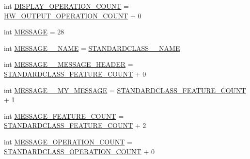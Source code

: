 \begin{DoxyCompactItemize}
\item 
int \hyperlink{interfaceshootingmachineemfmodel_1_1_shootingmachineemfmodel_package_a1b4ff159ceee549b0563fa4a343b65c2}{D\-I\-S\-P\-L\-A\-Y\-\_\-\-O\-P\-E\-R\-A\-T\-I\-O\-N\-\_\-\-C\-O\-U\-N\-T} = \hyperlink{interfaceshootingmachineemfmodel_1_1_shootingmachineemfmodel_package_a911c6904fe8043130ce479d0e1d2e0b6}{H\-W\-\_\-\-O\-U\-T\-P\-U\-T\-\_\-\-O\-P\-E\-R\-A\-T\-I\-O\-N\-\_\-\-C\-O\-U\-N\-T} + 0
\item 
int \hyperlink{interfaceshootingmachineemfmodel_1_1_shootingmachineemfmodel_package_a6cfab10c1d9f4ff2b045b82dabf2fca5}{M\-E\-S\-S\-A\-G\-E} = 28
\item 
int \hyperlink{interfaceshootingmachineemfmodel_1_1_shootingmachineemfmodel_package_a06b089367823068502816e69da5d9962}{M\-E\-S\-S\-A\-G\-E\-\_\-\-\_\-\-N\-A\-M\-E} = \hyperlink{interfaceshootingmachineemfmodel_1_1_shootingmachineemfmodel_package_a06475d7d54d52ee19b2aaf4d5d73c738}{S\-T\-A\-N\-D\-A\-R\-D\-C\-L\-A\-S\-S\-\_\-\-\_\-\-N\-A\-M\-E}
\item 
int \hyperlink{interfaceshootingmachineemfmodel_1_1_shootingmachineemfmodel_package_a128890f7aa05acf3d43a605af26d154b}{M\-E\-S\-S\-A\-G\-E\-\_\-\-\_\-\-M\-E\-S\-S\-A\-G\-E\-\_\-\-H\-E\-A\-D\-E\-R} = \hyperlink{interfaceshootingmachineemfmodel_1_1_shootingmachineemfmodel_package_a14037f66989b3107e402142df96ee9aa}{S\-T\-A\-N\-D\-A\-R\-D\-C\-L\-A\-S\-S\-\_\-\-F\-E\-A\-T\-U\-R\-E\-\_\-\-C\-O\-U\-N\-T} + 0
\item 
int \hyperlink{interfaceshootingmachineemfmodel_1_1_shootingmachineemfmodel_package_a73a9b27935f74a04999cbd904026a86f}{M\-E\-S\-S\-A\-G\-E\-\_\-\-\_\-\-M\-Y\-\_\-\-M\-E\-S\-S\-A\-G\-E} = \hyperlink{interfaceshootingmachineemfmodel_1_1_shootingmachineemfmodel_package_a14037f66989b3107e402142df96ee9aa}{S\-T\-A\-N\-D\-A\-R\-D\-C\-L\-A\-S\-S\-\_\-\-F\-E\-A\-T\-U\-R\-E\-\_\-\-C\-O\-U\-N\-T} + 1
\item 
int \hyperlink{interfaceshootingmachineemfmodel_1_1_shootingmachineemfmodel_package_aebbfc790024953cdc7c3f7d721c99cfc}{M\-E\-S\-S\-A\-G\-E\-\_\-\-F\-E\-A\-T\-U\-R\-E\-\_\-\-C\-O\-U\-N\-T} = \hyperlink{interfaceshootingmachineemfmodel_1_1_shootingmachineemfmodel_package_a14037f66989b3107e402142df96ee9aa}{S\-T\-A\-N\-D\-A\-R\-D\-C\-L\-A\-S\-S\-\_\-\-F\-E\-A\-T\-U\-R\-E\-\_\-\-C\-O\-U\-N\-T} + 2
\item 
int \hyperlink{interfaceshootingmachineemfmodel_1_1_shootingmachineemfmodel_package_a6326f815e736e221ea20b98e0ccf391b}{M\-E\-S\-S\-A\-G\-E\-\_\-\-O\-P\-E\-R\-A\-T\-I\-O\-N\-\_\-\-C\-O\-U\-N\-T} = \hyperlink{interfaceshootingmachineemfmodel_1_1_shootingmachineemfmodel_package_a2fe5d848cfe0a02fe5609e2c5ed7e7c7}{S\-T\-A\-N\-D\-A\-R\-D\-C\-L\-A\-S\-S\-\_\-\-O\-P\-E\-R\-A\-T\-I\-O\-N\-\_\-\-C\-O\-U\-N\-T} + 0

\end{DoxyCompactItemize}
